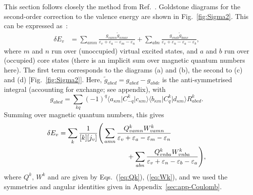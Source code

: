 \documentclass[10pt,twocolumn,a4paper]{article}%
\newcommand{\bra}[1]{\ensuremath{\langle #1|}}	%
\newcommand{\ket}[1]{\ensuremath{|#1\rangle}}	%
\newcommand{\be}{\begin{equation}}
\newcommand{\ee}{\end{equation}}
\def\en{\ensuremath{\varepsilon}}
\renewcommand{\k}{\ensuremath{\kappa}}
\begin{document}
This section follows closely the method from Ref.~\cite{DzubaHFS1984}.
Goldstone diagrams for the second-order correction to the valence energy are shown in Fig.~\ref{fig:Sigma2}.
This can be expressed as~\cite{DzubaHFS1984,JohnsonBook2007}:
\begin{align}\label{eq:dE-SO}
\delta E_v &= 
\sum_{amn}
\frac{g_{vamn}\widetilde g_{nmav}}{\en_v+\en_a - \en_m-\en_n}
+\sum_{abn}
 \frac{g_{vnab}\widetilde g_{banv}}{\en_v+\en_n-\en_a-\en_b}  ,
\end{align}
where $m$ and $n$ run over (unoccupied) virtual excited states, and $a$ and $b$ run over (occupied) core states (there is an implicit sum over magnetic quantum numbers here).
The first term corresponds to the diagrams (a) and (b), the second to (c) and (d) [Fig.~\ref{fig:Sigma2}].
Here,
$ \widetilde g_{abcd} =  g_{abcd} -  g_{abdc}$ 
is the anti-symmetrised integral (accounting for exchange; see appendix), with
\be
 g_{abcd} = \sum_{kq} (-1)^q \bra{a_{\k m}}C^k_{-q}\ket{c_{\k m}} \bra{b_{\k m}}C^k_{q}\ket{d_{\k m}} R^k_{abcd}.
\ee
Summing over magnetic quantum numbers, this gives~\cite{DzubaHFS1984}
\begin{align}\label{eq:dE-SO}
\delta E_v &=\sum_k \frac{1}{[k][j_v]}\Bigg(
 \sum_{amn} \frac{Q^k_{vamn}W^k_{vamn}}{\en_v+\en_a - \en_m-\en_n}
\notag\\&\qquad\qquad\qquad\qquad\qquad
+\sum_{abn}\frac{Q^k_{vnba}W^k_{vnba}}{\en_v+\en_n-\en_b-\en_a} 
 \Bigg),
\end{align}
where $Q^k,\,W^k$ and are given by Eqs.~(\ref{eq:Qk}), (\ref{eq:Wk}), and 
we used the symmetries and angular identities given in Appendix~\ref{sec:app-Coulomb}.
\end{document}
